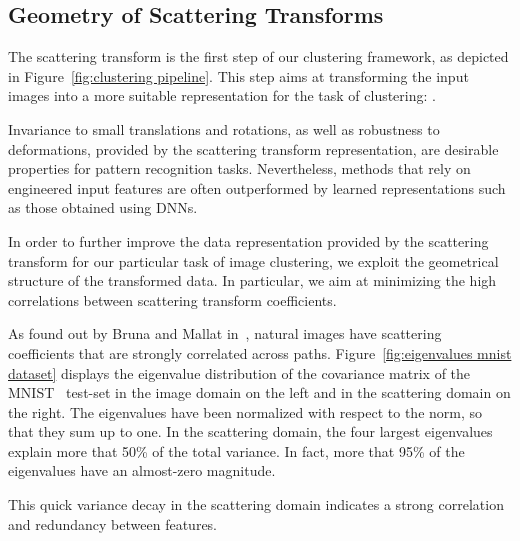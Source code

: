 \documentclass[11pt]{article}
\theoremstyle{definition}
\newcommand{\Figure}[1]{Figure~\ref{#1}}
\begin{document}
\subsection{Geometry of Scattering Transforms}\label{sec:Geometry of Scattering Transforms}

The scattering transform is the first step of our clustering framework, as depicted in \Figure{fig:clustering pipeline}. This step aims at transforming the input images into a more suitable representation for the task of clustering: . 


Invariance to small translations and rotations, as well as robustness to deformations, provided by the scattering transform representation, are desirable properties for pattern recognition tasks. Nevertheless, methods that rely on engineered input features are often outperformed by learned representations such as those obtained using DNNs.


In order to further improve the data representation provided by the scattering transform for our particular task of image clustering, we exploit the geometrical structure of the transformed data. In particular, we aim at minimizing the high correlations between scattering transform coefficients.


As found out by Bruna and Mallat in~\cite{Bruna_InvariantScattering_2012}, natural images have scattering coefficients that are strongly correlated across paths. 
\Figure{fig:eigenvalues mnist dataset} displays the eigenvalue distribution of the covariance matrix of the MNIST~\cite{LeCun_MnistDataset_1998} test-set in the image domain on the left and in the scattering domain on the right. The eigenvalues have been normalized with respect to the  norm, so that they sum up to one. In the scattering domain, the four largest eigenvalues explain more that 50\% of the total variance. In fact, more that 95\% of the eigenvalues have an almost-zero magnitude.

This quick variance decay in the scattering domain indicates a strong correlation and redundancy between features.
\end{document}
